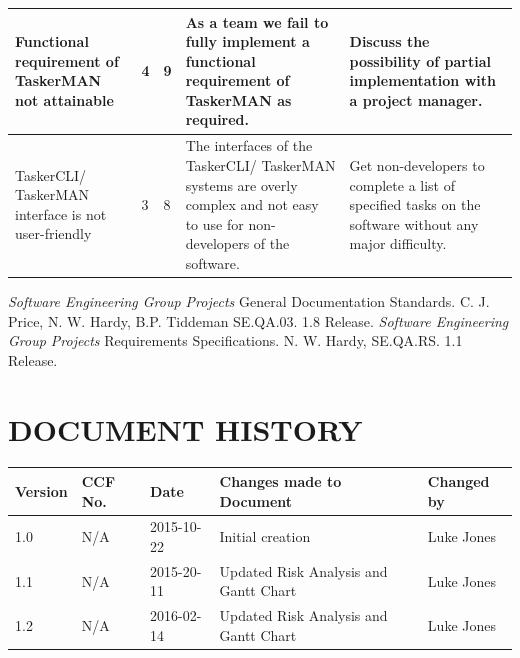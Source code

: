\documentclass{project}
\begin{document}
\begin{longtable}{ | p{3cm} | p{2cm} | p{2cm} | p{4cm} | p{4cm} |  }
Functional requirement of TaskerMAN not attainable & 4 & 9 & As a team we fail to fully implement a functional requirement of TaskerMAN as required\cite{se.qa.rs}. & Discuss the possibility of partial implementation with a project manager. \\ \hline
TaskerCLI/ TaskerMAN interface is not user-friendly & 3 & 8 & The interfaces of the TaskerCLI/ TaskerMAN systems are overly complex and not easy to use for non-developers of the software. & Get non-developers to complete a list of specified tasks on the software without any major difficulty. \\ \hline
\end{longtable}  
\begin{thebibliography}{5}
 \emph{Software Engineering Group Projects}
General Documentation Standards.
C. J. Price, N. W. Hardy, B.P. Tiddeman SE.QA.03. 1.8 Release.
 \emph{Software Engineering Group Projects}
Requirements Specifications.
N. W. Hardy, SE.QA.RS. 1.1 Release.
\end{thebibliography}
\section*{DOCUMENT HISTORY}
\begin{tabular}{|l | l | l | l | l |}
\hline
Version & CCF No. & Date & Changes made to Document & Changed by \\
\hline
1.0 & N/A & 2015-10-22 & Initial creation & Luke Jones\\
\hline
1.1 & N/A & 2015-20-11 & Updated Risk Analysis and Gantt Chart & Luke Jones\\
\hline
1.2 & N/A & 2016-02-14 & Updated Risk Analysis and Gantt Chart & Luke Jones\\
\hline
\end{tabular}
\label{thelastpage}
\end{document}
